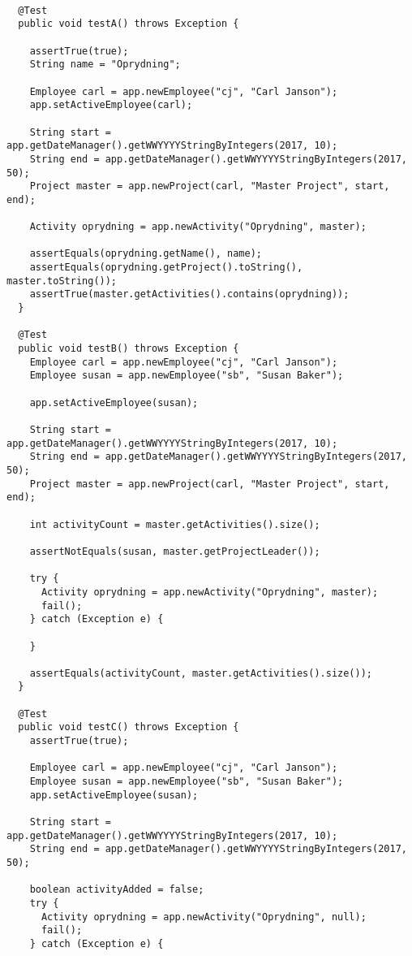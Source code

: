 \begin{lstlisting}

  @Test
  public void testA() throws Exception {

    assertTrue(true); 
    String name = "Oprydning";

    Employee carl = app.newEmployee("cj", "Carl Janson");
    app.setActiveEmployee(carl);

    String start = app.getDateManager().getWWYYYYStringByIntegers(2017, 10);
    String end = app.getDateManager().getWWYYYYStringByIntegers(2017, 50);
    Project master = app.newProject(carl, "Master Project", start, end);

    Activity oprydning = app.newActivity("Oprydning", master);

    assertEquals(oprydning.getName(), name); 
    assertEquals(oprydning.getProject().toString(), master.toString()); 
    assertTrue(master.getActivities().contains(oprydning)); 
  }

  @Test
  public void testB() throws Exception {
    Employee carl = app.newEmployee("cj", "Carl Janson");
    Employee susan = app.newEmployee("sb", "Susan Baker");

    app.setActiveEmployee(susan);

    String start = app.getDateManager().getWWYYYYStringByIntegers(2017, 10);
    String end = app.getDateManager().getWWYYYYStringByIntegers(2017, 50);
    Project master = app.newProject(carl, "Master Project", start, end);

    int activityCount = master.getActivities().size();

    assertNotEquals(susan, master.getProjectLeader());

    try {
      Activity oprydning = app.newActivity("Oprydning", master);
      fail();
    } catch (Exception e) {

    }

    assertEquals(activityCount, master.getActivities().size());
  }

  @Test
  public void testC() throws Exception {
    assertTrue(true);

    Employee carl = app.newEmployee("cj", "Carl Janson");
    Employee susan = app.newEmployee("sb", "Susan Baker");
    app.setActiveEmployee(susan);

    String start = app.getDateManager().getWWYYYYStringByIntegers(2017, 10);
    String end = app.getDateManager().getWWYYYYStringByIntegers(2017, 50);

    boolean activityAdded = false;
    try {
      Activity oprydning = app.newActivity("Oprydning", null);
      fail();
    } catch (Exception e) {


\end{lstlisting}
